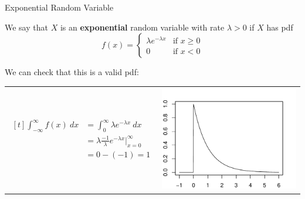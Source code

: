 \documentclass{beamer}
\renewcommand{\emph}{\textbf}
\begin{document}
\begin{frame}{Exponential Random Variable}
\begin{block}{}
We say that $X$ is an \emph{exponential} random variable with rate $\lambda>0$ if $X$ has pdf
$$f(x) = \begin{cases}\lambda e^{-\lambda x} & \text{if }x\geq 0 \\ 0 & \text{if }x<0\end{cases}$$
\end{block}
\pause We can check that this is a valid pdf:

\begin{tabular}{p{5.5cm}p{4cm}}
\vspace{0cm}
$\begin{aligned}[t]
\int_{-\infty}^\infty f(x)\ dx &= \int_0^\infty \lambda e^{-\lambda x}\ dx \\
&= \lambda \frac{-1}\lambda e^{-\lambda x}\Big\vert_{x=0}^\infty\\
&= 0 - (-1) = 1
\end{aligned}$
&
\vspace{-.25cm}
\includegraphics[scale=.55]{ch4_pdf_exp.pdf}
\end{tabular}
\end{frame}
\end{document}

